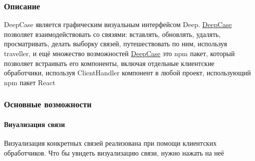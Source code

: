 \documentclass{article}
\begin{document}
\subsubsection{Описание}
DeepCase\hypertarget{DeepCase.Description}{} является графическим визуальным
интерфейсом Deep.
\hyperlink{DeepCase.Description}{DeepCase} позволяет взаимодействовать со
связями:
вставлять,
обновлять, удалять, просматривать, делать выборку связей,
путешествовать по ним, используя traveller, и ещё множество возможностей
\hyperlink{DeepCase.Description}{DeepCase} это npm пакет, который позволяет
встраивать
его компоненты, включая
отдельные клиентские обработчики, используя ClientHandler компонент в любой
проект, использующий npm пакет React
\subsubsection{Основные возможности}
\paragraph{Виуализация связи}
Визуализация конкретных связей реализована при помощи клиентских обработчиков.
Что бы увидеть визуализацию связи, нужно нажать на неё
\end{document}
